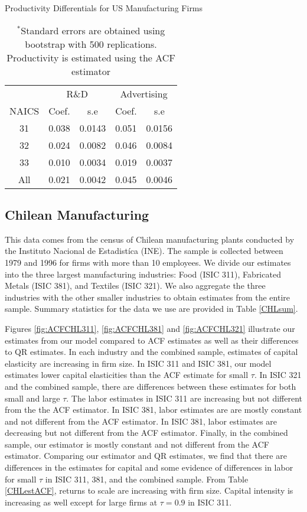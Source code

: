 \documentclass[11pt]{article}
\begin{document}
\begin{table}[H]
\centering
\caption{Productivity Differentials for US Manufacturing Firms}
\begin{tabular}{ccccc}
  \hline\hline & \multicolumn{2}{c}{R\&D}  & \multicolumn{2}{c}{Advertising} \\ \cmidrule(lr){2-3} \cmidrule(lr){4-5}NAICS & Coef. & s.e & Coef. & s.e \\ 
  \hline
31 & 0.038 & 0.0143 & 0.051 & 0.0156 \\ 
  32 & 0.024 & 0.0082 & 0.046 & 0.0084 \\ 
  33 & 0.010 & 0.0034 & 0.019 & 0.0037 \\ 
  All & 0.021 & 0.0042 & 0.045 & 0.0046 \\ 
   \hline
\end{tabular}
\caption*{\footnotesize $^{*}$Standard errors are obtained using bootstrap with 500 replications. Productivity is estimated using the ACF estimator}
\end{table}

\subsection{Chilean Manufacturing}
This data comes from the census of Chilean manufacturing plants conducted by the Instituto Nacional de Estadist\'ica (INE). The sample is collected between 1979 and 1996 for firms with more than 10 employees. We divide our estimates into the three largest manufacturing industries: Food (ISIC 311), Fabricated Metals (ISIC 381), and Textiles (ISIC 321). We also aggregate the three industries with the other smaller industries to obtain estimates from the entire sample. Summary statistics for the data we use are provided in Table \ref{CHLsum}.

Figures \ref{fig:ACFCHL311}, \ref{fig:ACFCHL381} and \ref{fig:ACFCHL321} illustrate our estimates from our model compared to ACF estimates as well as their differences to QR estimates. In each industry and the combined sample, estimates of capital elasticity are increasing in firm size. In ISIC 311 and ISIC 381, our model estimates lower capital elasticities than the ACF estimate for small $\tau$. In ISIC 321 and the combined sample, there are differences between these estimates for both small and large $\tau$. The labor estimates in ISIC 311 are increasing but not different from the the ACF estimator. In ISIC 381, labor estimates are are mostly constant and not different from the ACF estimator. In ISIC 381, labor estimates are decreasing but not different from the ACF estimator. Finally, in the combined sample, our estimator is mostly constant and not different from the ACF estimator. Comparing our estimator and QR estimates, we find that there are differences in the estimates for capital and some evidence of differences in labor for small $\tau$ in ISIC 311, 381, and the combined sample. From Table \ref{CHLestACF}, returns to scale are increasing with firm size. Capital intensity is increasing as well except for large firms at $\tau=0.9$ in ISIC 311.
\end{document}
